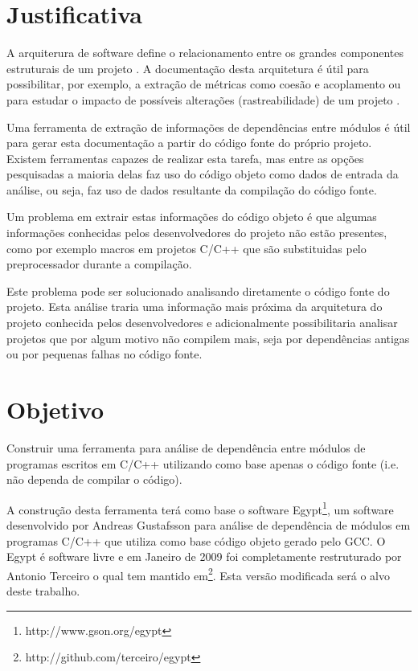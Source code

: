 \chapter{Justificativa}

A arquiterura de software define o relacionamento entre os grandes componentes
estruturais de um projeto \cite{EngenhariaDeSoftwarePressman}. A documentação
desta arquitetura é útil para possibilitar, por exemplo, a extração de métricas
como coesão e acoplamento ou para estudar o impacto de possíveis alterações
(rastreabilidade) de um projeto \cite{mata26-terceiro-projeto-piloto}.

Uma ferramenta de extração de informações de dependências entre módulos é útil
para gerar esta documentação a partir do código fonte do próprio projeto.
Existem ferramentas capazes de realizar esta tarefa, mas entre as opções
pesquisadas \cite{SourceVersusObjectCodeExtraction} a maioria delas faz uso do
código objeto como dados de entrada da análise, ou seja, faz uso de dados
resultante da compilação do código fonte.

Um problema em extrair estas informações do código objeto é que algumas
informações conhecidas pelos desenvolvedores do projeto não estão presentes,
como por exemplo macros em projetos C/C++ que são substituidas pelo
preprocessador \cite{SourceVersusObjectCodeExtraction} durante a compilação.

Este problema pode ser solucionado analisando diretamente o código fonte do
projeto. Esta análise traria uma informação mais próxima da arquitetura do
projeto conhecida pelos desenvolvedores e adicionalmente possibilitaria
analisar projetos que por algum motivo não compilem mais, seja por dependências
antigas ou por pequenas falhas no código fonte.

\chapter{Objetivo}

Construir uma ferramenta para análise de dependência entre módulos de programas
escritos em C/C++ utilizando como base apenas o código fonte (i.e.  não dependa
de compilar o código).

A construção desta ferramenta terá como base o software
Egypt\footnote{http://www.gson.org/egypt}, um software desenvolvido por Andreas
Gustafsson para análise de dependência de módulos em programas C/C++ que
utiliza como base código objeto gerado pelo GCC. O Egypt é software livre e em
Janeiro de 2009 foi completamente restruturado por Antonio Terceiro o qual tem
mantido em\footnote{http://github.com/terceiro/egypt}. Esta versão modificada
será o alvo deste trabalho.

